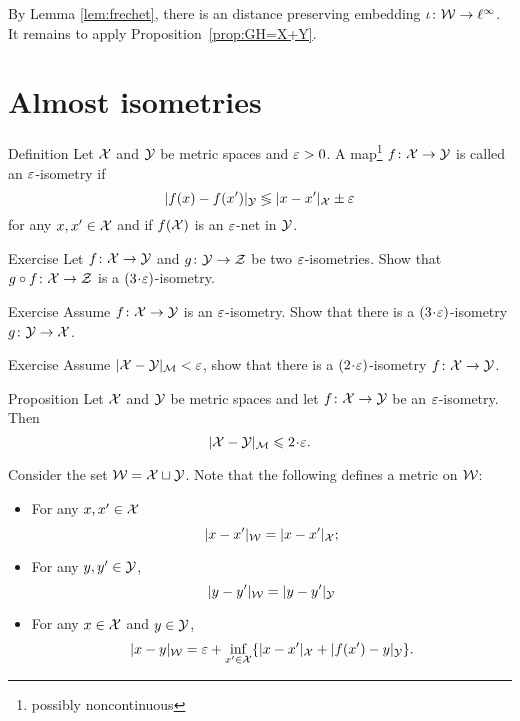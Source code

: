By Lemma \ref{lem:frechet}, there is an distance preserving embedding $\iota\:\spc{W}\z\to \ell^\infty$.
It remains to apply Proposition~\ref{prop:GH=X+Y}.
\qeds



\section{Almost isometries}\label{sec:alm-isom}

\begin{thm}{Definition} Let $\mathcal{X}$ and $\mathcal{Y}$ be metric spaces and $\varepsilon > 0$. 
A  map\footnote{possibly noncontinuous} $f\: \spc{X} \z\to \spc{Y}$ is called an $\varepsilon$-isometry 
if 
$$|f(x)-f(x')|_{\mathcal{Y}}\lessgtr |x-x'|_{\mathcal{X}}\pm\varepsilon$$
for any $x,x'\in \mathcal{X}$ 
and if $f(\mathcal{X})$ is an $\varepsilon$-net in $\mathcal{Y}$.
\end{thm}

\begin{thm}{Exercise}\label{ex:alm-isom:compositon}
Let $f\colon\mathcal{X}\to \mathcal{Y}$ and $g\colon\mathcal{Y}\to \mathcal{Z}$ be two $\varepsilon$-isometries.
Show that $g\circ f\colon \mathcal{X}\to \mathcal{Z}$ is a $(3\cdot\eps)$-isometry.
\end{thm}


\begin{thm}{Exercise}\label{ex:alm-isom:inverse}
 Assume $f\: \spc{X} \z\to \spc{Y}$ is an $\varepsilon$-isometry.
Show that there is a $(3\cdot\eps)$-isometry 
$g\colon \mathcal{Y}\to \mathcal{X}$.
\end{thm}

\begin{thm}{Exercise}\label{ex:GH=>eps-isom}
Assume $|\mathcal{X}-\mathcal{Y}|_{\mathcal{M}}<\varepsilon$, show that there is a $(2\cdot\eps)$-isometry 
$f\colon \mathcal{X}\to \mathcal{Y}$.
\end{thm}

\begin{thm}{Proposition}\label{prop:alm-isom=>GH}
Let $\mathcal{X}$ and $\mathcal{Y}$ be metric spaces 
and let $f\colon \mathcal{X}\to \mathcal{Y}$ be an $\varepsilon$-isometry.
Then 
\[|\spc{X}-\spc{Y}|_{\spc{M}}\le 2\cdot \eps.\]
\end{thm}

 Consider the set $\mathcal{W}=\mathcal{X}\sqcup \mathcal{Y}$.
Note that the following defines a metric on $\mathcal{W}$:
\begin{itemize}
\item  For any $x,x'\in \mathcal{X}$
$$|x-x'|_{\mathcal{W}}=|x-x'|_{\mathcal{X}};$$
\item For any $y,y'\in \mathcal{Y}$,
$$|y-y'|_{\mathcal{W}}=|y-y'|_{\mathcal{Y}}$$
\item For any $x\in \mathcal{X}$ and $y\in \mathcal{Y}$,
$$|x-y|_{\mathcal{W}}=\varepsilon+\inf_{x'\in \mathcal{X}}\{|x-x'|_{\mathcal{X}}+|f(x')-y|_{\mathcal{Y}}\}.$$
\end{itemize}

